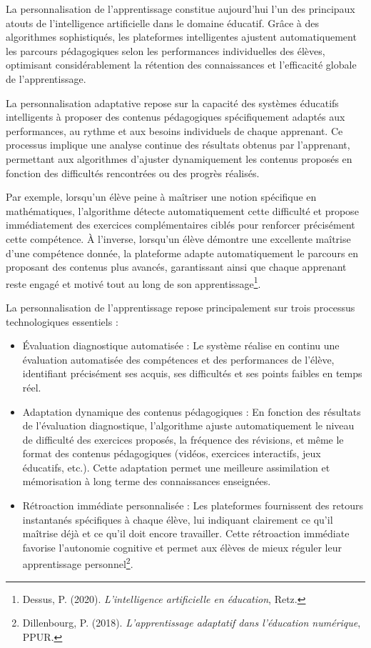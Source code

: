 \documentclass[12pt,a4paper]{report}
\begin{document}
La personnalisation de l’apprentissage constitue aujourd’hui l’un des principaux atouts de l’intelligence artificielle dans le domaine éducatif. Grâce à des algorithmes sophistiqués, les plateformes intelligentes ajustent automatiquement les parcours pédagogiques selon les performances individuelles des élèves, optimisant considérablement la rétention des connaissances et l’efficacité globale de l’apprentissage.

La personnalisation adaptative repose sur la capacité des systèmes éducatifs intelligents à proposer des contenus pédagogiques spécifiquement adaptés aux performances, au rythme et aux besoins individuels de chaque apprenant. Ce processus implique une analyse continue des résultats obtenus par l’apprenant, permettant aux algorithmes d’ajuster dynamiquement les contenus proposés en fonction des difficultés rencontrées ou des progrès réalisés.

Par exemple, lorsqu’un élève peine à maîtriser une notion spécifique en mathématiques, l’algorithme détecte automatiquement cette difficulté et propose immédiatement des exercices complémentaires ciblés pour renforcer précisément cette compétence. À l’inverse, lorsqu’un élève démontre une excellente maîtrise d’une compétence donnée, la plateforme adapte automatiquement le parcours en proposant des contenus plus avancés, garantissant ainsi que chaque apprenant reste engagé et motivé tout au long de son apprentissage\footnote{Dessus, P. (2020). \textit{L’intelligence artificielle en éducation}, Retz.}.

La personnalisation de l’apprentissage repose principalement sur trois processus technologiques essentiels :

\begin{itemize}
    \item Évaluation diagnostique automatisée :
Le système réalise en continu une évaluation automatisée des compétences et des performances de l’élève, identifiant précisément ses acquis, ses difficultés et ses points faibles en temps réel.

    \item Adaptation dynamique des contenus pédagogiques :
En fonction des résultats de l’évaluation diagnostique, l’algorithme ajuste automatiquement le niveau de difficulté des exercices proposés, la fréquence des révisions, et même le format des contenus pédagogiques (vidéos, exercices interactifs, jeux éducatifs, etc.). Cette adaptation permet une meilleure assimilation et mémorisation à long terme des connaissances enseignées.

    \item Rétroaction immédiate personnalisée :
Les plateformes fournissent des retours instantanés spécifiques à chaque élève, lui indiquant clairement ce qu’il maîtrise déjà et ce qu’il doit encore travailler. Cette rétroaction immédiate favorise l’autonomie cognitive et permet aux élèves de mieux réguler leur apprentissage personnel\footnote{Dillenbourg, P. (2018). \textit{L’apprentissage adaptatif dans l’éducation numérique}, PPUR.}.

\end{itemize}
\end{document}
